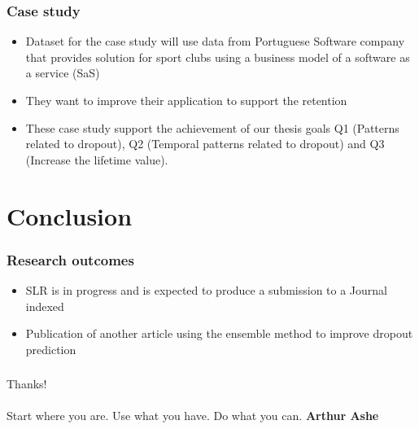 \documentclass[10pt]{beamer}
\begin{document}
\begin{frame}
	\frametitle{Case study}
	\begin{itemize}
		\item Dataset for the case study will use data from Portuguese Software company that provides solution for sport 
			  clubs using a business model of a software as a service (SaS)
		\item They want to improve their application to support the retention
		\item These case study support the achievement of our thesis goals Q1 (Patterns related to dropout), 
			  Q2 (Temporal patterns related to dropout) and Q3 (Increase the lifetime value).
	\end{itemize}
\end{frame}
\section{Conclusion}
\begin{frame}
	\frametitle{Research outcomes}
	\begin{itemize}

		\item SLR is in progress and is expected to produce a submission to a Journal indexed
		\item Publication of another article using the ensemble method to improve dropout prediction  
	\end{itemize}
	\tiny 

\end{frame}


\begin{frame}
\frametitle{}
\normalsize
	\Huge Thanks! \\~\\
	\Large Start where you are. Use what you have. Do what you can. \textbf{Arthur Ashe}
\end{frame}
\end{document}
